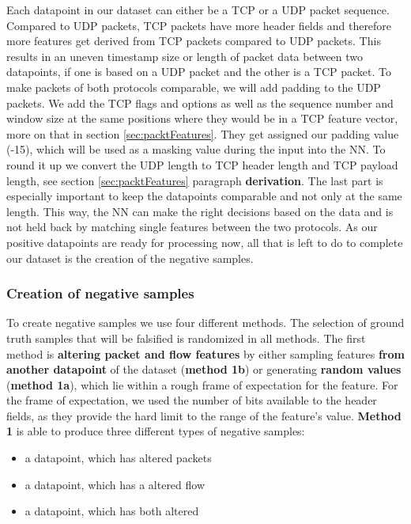 \documentclass[
	ngerman,
	ruledheaders=section,%
	class=report,%
	thesis={type=bachelor},%
	accentcolor=9c,%
	custommargins=true,%
	marginpar=false,%
	parskip=half-,%
	fontsize=11pt,%
]{tudapub}
\begin{document}
Each datapoint in our dataset can either be a TCP or a UDP packet sequence.
Compared to UDP packets, TCP packets have more header fields and therefore more features get derived from TCP packets compared to UDP packets.
This results in an uneven timestamp size or length of packet data between two datapoints, if one is based on a UDP packet and the other is a TCP packet.
To make packets of both protocols comparable, we will add padding to the UDP packets.
We add the TCP flags and options as well as the sequence number and window size at the same positions where they would be in a TCP feature vector, more on that in section \ref{sec:packtFeatures}.
They get assigned our padding value (-15), which will be used as a masking value during the input into the NN.
To round it up we convert the UDP length to TCP header length and TCP payload length, see section \ref{sec:packtFeatures} paragraph \textbf{derivation}.
The last part is especially important to keep the datapoints comparable and not only at the same length.
This way, the NN can make the right decisions based on the data and is not held back by matching single features between the two protocols.
As our positive datapoints are ready for processing now, all that is left to do to complete our dataset is the creation of the negative samples.

\subsubsection{Creation of negative samples}
\label{sec:negativeSamples}

To create negative samples we use four different methods.
The selection of ground truth samples that will be falsified is randomized in all methods.
The first method is \textbf{altering packet and flow features} by either sampling features \textbf{from another datapoint} of the dataset (\textbf{method 1b}) or generating \textbf{random values} (\textbf{method 1a}), which lie within a rough frame of expectation for the feature.
For the frame of expectation, we used the number of bits available to the header fields, as they provide the hard limit to the range of the feature's value.
\textbf{Method 1} is able to produce three different types of negative samples:

\begin{itemize}
    \item a datapoint, which has altered packets
    \item a datapoint, which has a altered flow
    \item a datapoint, which has both altered
\end{itemize}
\end{document}
